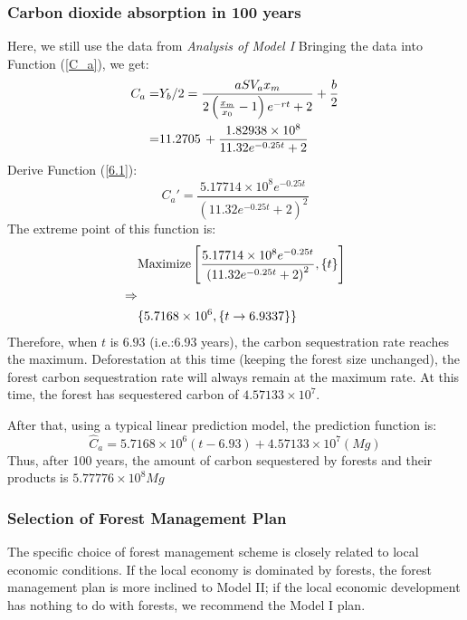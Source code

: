 \documentclass[12pt]{article}
\begin{document}
\subsubsection{Carbon dioxide absorption in 100 years} \label{611}
Here, we still use the data from \emph{Analysis of Model I}
Bringing the data into Function (\ref{C_a}), we get:
\begin{align}
    C_a = & Y_b/2=\frac{a S V_a x_m}{2\left(\frac{x_m}{x_0}-1\right) e^{-r t}+2}+\frac{b}{2} \notag \\
    =     & 11.2705\, +\frac{1.82938\times 10^8}{11.32 e^{-0.25 t}+2} \label{6.1}
\end{align}
Derive Function (\ref{6.1}):
\begin{equation*}
    C_a'=\frac{5.17714\times 10^8 e^{-0.25 t}}{\left(11.32 e^{-0.25 t}+2\right)^2}
\end{equation*}
The extreme point of this function is:
\begin{align}
                & \text{Maximize}\left[\frac{5.17714\times 10^8 e^{-0.25 t}}{\left(11.32 e^{-0.25 t}+2\right)^2},\{t\}\right] \notag \\
    \Rightarrow & \notag                                                                                                             \\
                & \{5.7168\times 10^6,\{t\to 6.9337\}\} \notag
\end{align}
Therefore, when $t$ is $6.93$ (i.e.:6.93 years), the carbon sequestration rate reaches the maximum.
Deforestation at this time (keeping the forest size unchanged), the forest carbon sequestration rate will always remain at the maximum rate.
At this time, the forest has sequestered carbon of $4.57133\times 10^7$.

After that, using a typical linear prediction model, the prediction function
is:
\[\hat{C}_a=5.7168\times 10^6 (t-6.93)+4.57133\times 10^7(Mg)\]
Thus, after 100 years, the amount of carbon sequestered by forests and their
products is $5.77776\times 10^8Mg$
\subsubsection{Selection of Forest Management Plan}
The specific choice of forest management scheme is closely related to local
economic conditions. If the local economy is dominated by forests, the forest
management plan is more inclined to Model II; if the local economic development
has nothing to do with forests, we recommend the Model I plan.
\end{document}

